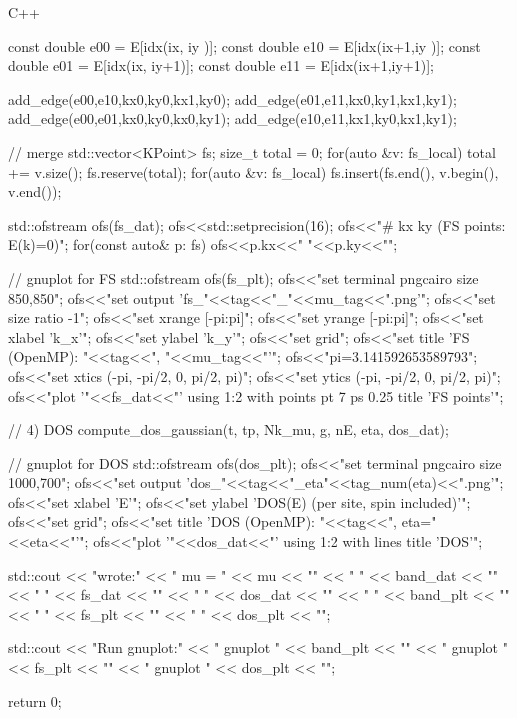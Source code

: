 \documentclass[12pt]{jreport}
\begin{document}
\begin{codebox}{C++}
{{{{{                    const double e00 = E[idx(ix,  iy  )];
                    const double e10 = E[idx(ix+1,iy  )];
                    const double e01 = E[idx(ix,  iy+1)];
                    const double e11 = E[idx(ix+1,iy+1)];

                    add_edge(e00,e10,kx0,ky0,kx1,ky0);
                    add_edge(e01,e11,kx0,ky1,kx1,ky1);
                    add_edge(e00,e01,kx0,ky0,kx0,ky1);
                    add_edge(e10,e11,kx1,ky0,kx1,ky1);
                }
            }
        }

        // merge
        std::vector<KPoint> fs;
        size_t total = 0;
        for(auto &v: fs_local) total += v.size();
        fs.reserve(total);
        for(auto &v: fs_local){
            fs.insert(fs.end(), v.begin(), v.end());
        }

        std::ofstream ofs(fs_dat);
        ofs<<std::setprecision(16);
        ofs<<"# kx ky  (FS points: E(k)=0)\n";
        for(const auto& p: fs) ofs<<p.kx<<" "<<p.ky<<"\n";
    }

    // gnuplot for FS
    {
        std::ofstream ofs(fs_plt);
        ofs<<"set terminal pngcairo size 850,850\n";
        ofs<<"set output 'fs_"<<tag<<"_"<<mu_tag<<".png'\n";
        ofs<<"set size ratio -1\n";
        ofs<<"set xrange [-pi:pi]\n";
        ofs<<"set yrange [-pi:pi]\n";
        ofs<<"set xlabel 'k_x'\n";
        ofs<<"set ylabel 'k_y'\n";
        ofs<<"set grid\n";
        ofs<<"set title 'FS (OpenMP): "<<tag<<", "<<mu_tag<<"'\n";
        ofs<<"pi=3.141592653589793\n";
        ofs<<"set xtics (-pi, -pi/2, 0, pi/2, pi)\n";
        ofs<<"set ytics (-pi, -pi/2, 0, pi/2, pi)\n";
        ofs<<"plot '"<<fs_dat<<"' using 1:2 with points pt 7 ps 0.25 title 'FS points'\n";
    }

    // 4) DOS
    compute_dos_gaussian(t, tp, Nk_mu, g, nE, eta, dos_dat);

    // gnuplot for DOS
    {
        std::ofstream ofs(dos_plt);
        ofs<<"set terminal pngcairo size 1000,700\n";
        ofs<<"set output 'dos_"<<tag<<"_eta"<<tag_num(eta)<<".png'\n";
        ofs<<"set xlabel 'E'\n";
        ofs<<"set ylabel 'DOS(E)  (per site, spin included)'\n";
        ofs<<"set grid\n";
        ofs<<"set title 'DOS (OpenMP): "<<tag<<", eta="<<eta<<"'\n";
        ofs<<"plot '"<<dos_dat<<"' using 1:2 with lines title 'DOS'\n";
    }

    std::cout << "\n[done] wrote:\n"
              << "  mu = " << mu << "\n"
              << "  " << band_dat << "\n"
              << "  " << fs_dat   << "\n"
              << "  " << dos_dat  << "\n"
              << "  " << band_plt << "\n"
              << "  " << fs_plt   << "\n"
              << "  " << dos_plt  << "\n\n";

    std::cout << "Run gnuplot:\n"
              << "  gnuplot " << band_plt << "\n"
              << "  gnuplot " << fs_plt   << "\n"
              << "  gnuplot " << dos_plt  << "\n";

    return 0;
}
\end{codebox}
\end{document}
